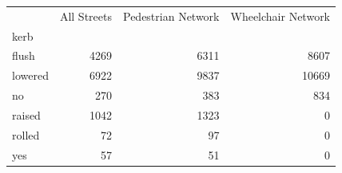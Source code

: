\begin{center}
\begin{tabular}{|l|r|r|r|}
\hline
 & All Streets & Pedestrian Network & Wheelchair Network \\
kerb &  &  &  \\
\hline
flush & 4269 & 6311 & 8607 \\
lowered & 6922 & 9837 & 10669 \\
no & 270 & 383 & 834 \\
raised & 1042 & 1323 & 0 \\
rolled & 72 & 97 & 0 \\
yes & 57 & 51 & 0 \\
\hline
\end{tabular}
\end{center}